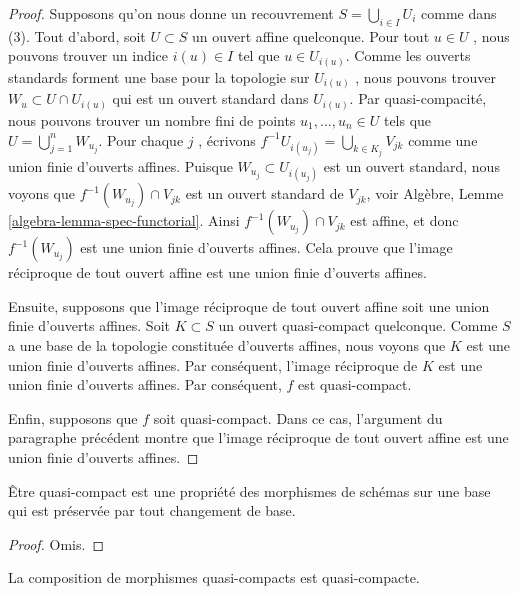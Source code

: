\begin{proof}
Supposons qu'on nous donne un recouvrement  $S = \bigcup_{i \in I} U_i$  comme dans (3). Tout
d'abord, soit  $U \subset S$  un ouvert affine quelconque. Pour tout  $u \in U$ ,
nous pouvons trouver un indice  $i(u) \in I$  tel que  $u \in U_{i(u)}$. Comme les
ouverts standards forment une base pour la topologie sur  $U_{i(u)}$ , nous
pouvons trouver  $W_u \subset U \cap U_{i(u)}$  qui est un ouvert standard dans  $U_{i(u)}$. Par
quasi-compacité, nous pouvons trouver un nombre fini de points  $u_1, \ldots, u_n \in U$  tels que
 $U = \bigcup_{j = 1}^n W_{u_j}$. Pour chaque  $j$ , écrivons  $f^{-1}U_{i(u_j)} = \bigcup_{k \in K_j} V_{jk}$  comme une union
finie d'ouverts affines. Puisque  $W_{u_j} \subset U_{i(u_j)}$  est un ouvert standard, nous voyons
que  $f^{-1}(W_{u_j}) \cap V_{jk}$  est un ouvert standard de  $V_{jk}$, voir Algèbre, Lemme
 \ref{algebra-lemma-spec-functorial}. Ainsi  $f^{-1}(W_{u_j}) \cap V_{jk}$  est affine, et donc  $f^{-1}(W_{u_j})$  est une union
finie d'ouverts affines. Cela prouve que l'image réciproque de tout ouvert affine est
une union finie d'ouverts affines.

\medskip\noindent
Ensuite, supposons que l'image réciproque de tout ouvert affine soit une union
finie d'ouverts affines. Soit  $K \subset S$  un ouvert quasi-compact quelconque.
Comme  $S$  a une base de la topologie constituée d'ouverts affines, nous
voyons que  $K$  est une union finie d'ouverts affines. Par conséquent,
l'image réciproque de  $K$  est une union finie d'ouverts affines. Par
conséquent,  $f$  est quasi-compact.

\medskip\noindent
Enfin, supposons que  $f$  soit quasi-compact. Dans ce cas, l'argument du
paragraphe précédent montre que l'image réciproque de tout ouvert affine est une
union finie d'ouverts affines.
\end{proof}

\begin{lemma}
\label{lemma-quasi-compact-preserved-base-change}
Être quasi-compact est une propriété des morphismes de schémas sur une base qui
est préservée par tout changement de base.
\end{lemma}

\begin{proof}
Omis.
\end{proof}

\begin{lemma}
\label{lemma-composition-quasi-compact}
La composition de morphismes quasi-compacts est quasi-compacte.
\end{lemma}

